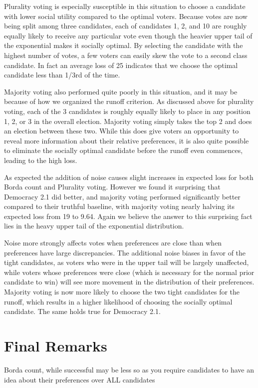 \documentclass[11pt]{scrartcl}
\begin{document}
Plurality voting is especially susceptible in this situation to choose a candidate with lower social utility compared to the optimal voters. Because votes are now being split among three candidates, each of candidates 1, 2, and 10 are roughly equally likely to receive any particular vote even though the heavier upper tail of the exponential makes it socially optimal. By selecting the candidate with the highest number of votes, a few voters can easily skew the vote to a second class candidate. In fact an average loss of 25 indicates that we choose the optimal candidate less than 1/3rd of the time.

Majority voting also performed quite poorly in this situation, and it may be because of how we organized the runoff criterion. As discussed above for plurality voting, each of the 3 candidates is roughly equally likely to place in any position 1, 2, or 3 in the overall election. Majority voting simply takes the top 2 and does an election between these two. While this does give voters an opportunity to reveal more information about their relative preferences, it is also quite possible to eliminate the socially optimal candidate before the runoff even commences, leading to the high loss.

As expected the addition of noise causes slight increases in expected loss for both Borda count and Plurality voting. However we found it surprising that Democracy 2.1 did better, and majority voting performed significantly better compared to their truthful baseline, with majority voting nearly halving its expected loss from 19 to 9.64. Again we believe the answer to this surprising fact lies in the heavy upper tail of the exponential distribution.

Noise more strongly affects votes when preferences are close than when preferences have large discrepancies. The additional noise biases in favor of the tight candidates, as voters who were in the upper tail will be largely unaffected, while voters whose preferences were close (which is necessary for the normal prior candidate to win) will see more movement in the distribution of their preferences. Majority voting is now more likely to choose the two tight candidates for the runoff, which results in a higher likelihood of choosing the socially optimal candidate. The same holds true for Democracy 2.1.


\section{Final Remarks}

Borda count, while successful may be less so as you require candidates to have an idea about their preferences over ALL candidates
\end{document}
